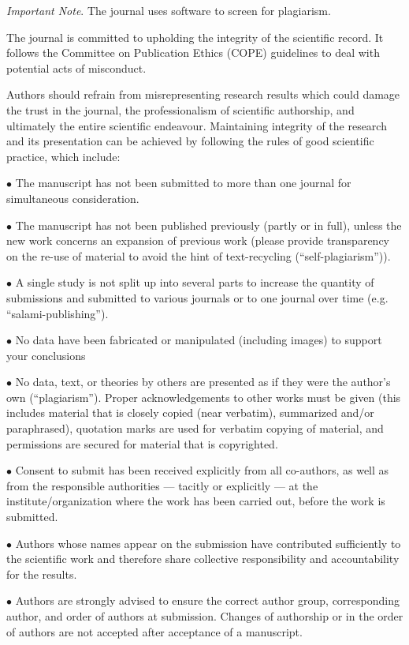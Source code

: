 \documentclass[twoside]{article}
\begin{document}
\begin{multicols}{2}
{\it Important Note}. The journal uses software to screen for plagiarism.

The journal is committed to upholding the integrity of the scientific record. It follows the Committee on Publication Ethics (COPE) guidelines to deal with potential acts of misconduct.

Authors should refrain from misrepresenting research results which could damage the trust in the journal, the professionalism of scientific authorship, and ultimately the entire scientific endeavour. Maintaining integrity of the research and its presentation can be achieved by following the rules of good scientific practice, which include:

$\bullet$ The manuscript has not been submitted to more than one journal for simultaneous consideration.

$\bullet$ The manuscript has not been published previously (partly or in full), unless the new work concerns an expansion of previous work (please provide transparency on the re-use of material to avoid the hint of text-recycling (``self-plagiarism'')).

$\bullet$ A single study is not split up into several parts to increase the quantity of submissions and submitted to various journals or to one journal over time (e.g. ``salami-publishing'').

$\bullet$ No data have been fabricated or manipulated (including images) to support your conclusions

$\bullet$ No data, text, or theories by others are presented as if they were the author's own (``plagiarism''). Proper acknowledgements to other works must be given (this includes material that is closely copied (near verbatim), summarized and/or paraphrased), quotation marks are used for verbatim copying of material, and permissions are secured for material that is copyrighted.

$\bullet$ Consent to submit has been received explicitly from all co-authors, as well as from the responsible authorities --- tacitly or explicitly --- at the institute/organization where the work has been carried out, before the work is submitted.

$\bullet$ Authors whose names appear on the submission have contributed sufficiently to the scientific work and therefore share collective responsibility and accountability for the results.

$\bullet$ Authors are strongly advised to ensure the correct author group, corresponding author, and order of authors at submission. Changes of authorship or in the order of authors are not accepted after acceptance of a manuscript.


\end{multicols}
\end{document}
